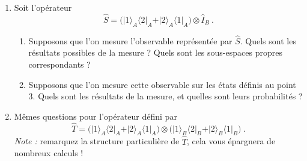 \begin{enumerate}
\item Soit l'opérateur  
\begin{equation}
\hat S= \Big( \vert 1\rangle_A \langle 2 \vert_A
 +
  \vert 2\rangle_A \langle 1 \vert_A\Big)
\otimes \hat I_B 
 \ .
\end{equation}
\begin{enumerate}
\item Supposons que l'on mesure l'observable représentée par $\hat S$. Quels sont les résultats possibles de la mesure ? Quels sont les sous-espaces propres correspondants ? 
\item Supposons que l'on mesure cette observable sur les états définis au point 3. Quels sont les résultats de la mesure, et quelles sont leurs probabilités ?
\end{enumerate}
\item Mêmes questions pour l'opérateur défini par
\begin{equation}
\hat T= \Big( \vert 1\rangle_A \langle 2 \vert_A
 +
  \vert 2\rangle_A \langle 1 \vert_A\Big)
\otimes\Big( \vert 1\rangle_B \langle 2 \vert_B
 +
  \vert 2\rangle_B \langle 1 \vert_B\Big)
 \ .
\end{equation}
\textit{Note :} remarquez la structure particulière de $\hat T$, cela vous épargnera de nombreux calculs !

\end{enumerate}